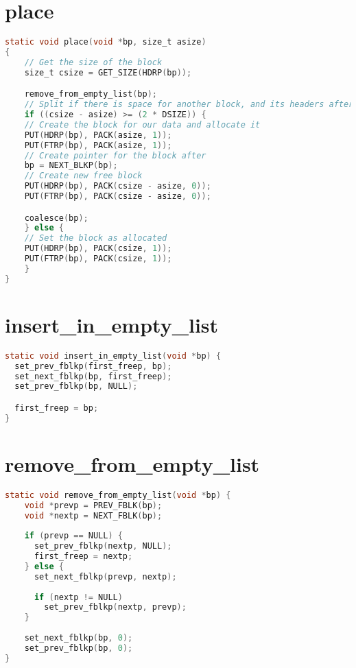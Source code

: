 \documentclass[11pt]{report}
\begin{document}
\section{place}\label{appendix:malloc_lab_code_place}
\begin{lstlisting}[language=C]
static void place(void *bp, size_t asize)
{
    // Get the size of the block
    size_t csize = GET_SIZE(HDRP(bp));

    remove_from_empty_list(bp);
    // Split if there is space for another block, and its headers after our data
    if ((csize - asize) >= (2 * DSIZE)) {
    // Create the block for our data and allocate it
    PUT(HDRP(bp), PACK(asize, 1));
    PUT(FTRP(bp), PACK(asize, 1));
    // Create pointer for the block after
    bp = NEXT_BLKP(bp);
    // Create new free block
    PUT(HDRP(bp), PACK(csize - asize, 0));
    PUT(FTRP(bp), PACK(csize - asize, 0));

    coalesce(bp);
    } else {
    // Set the block as allocated
    PUT(HDRP(bp), PACK(csize, 1));
    PUT(FTRP(bp), PACK(csize, 1));
    }
}
\end{lstlisting}

\section{insert\_in\_empty\_list}\label{appendix:malloc_lab_code_insert_in_empty_list}
\begin{lstlisting}[language=C]
static void insert_in_empty_list(void *bp) {
  set_prev_fblkp(first_freep, bp);
  set_next_fblkp(bp, first_freep);
  set_prev_fblkp(bp, NULL);

  first_freep = bp;
}
\end{lstlisting}

\section{remove\_from\_empty\_list}\label{appendix:malloc_lab_code_remove_from_empty_list}
\begin{lstlisting}[language=C]
static void remove_from_empty_list(void *bp) {
    void *prevp = PREV_FBLK(bp);
    void *nextp = NEXT_FBLK(bp);
  
    if (prevp == NULL) {
      set_prev_fblkp(nextp, NULL);
      first_freep = nextp;
    } else {
      set_next_fblkp(prevp, nextp);
  
      if (nextp != NULL)
        set_prev_fblkp(nextp, prevp);
    }
  
    set_next_fblkp(bp, 0);
    set_prev_fblkp(bp, 0);
}
\end{lstlisting}
\end{document}
